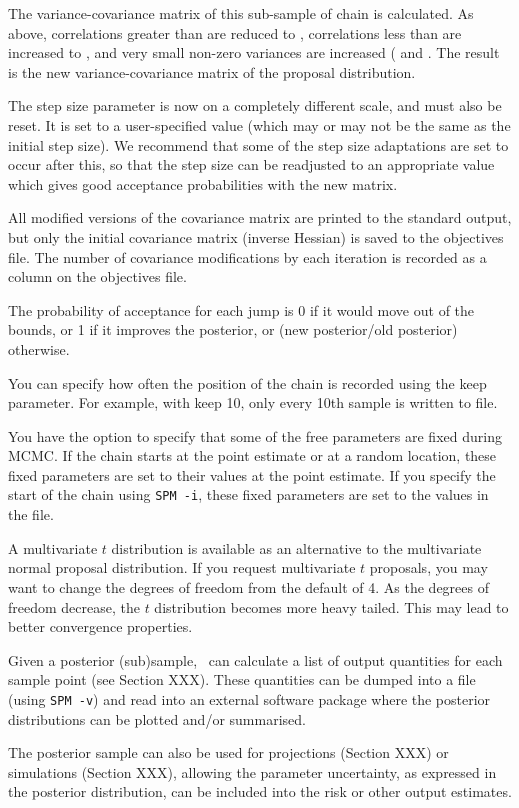 The variance-covariance matrix of this sub-sample of chain is calculated. As above, correlations greater than  are reduced to , correlations less than  are increased to  , and very small non-zero variances are increased ( and . The result is the new variance-covariance matrix of the proposal distribution.

The step size parameter is now on a completely different scale, and must also be reset. It is set to a user-specified value (which may or may not be the same as the initial step size). We recommend that some of the step size adaptations are set to occur after this, so that the step size can be readjusted to an appropriate value which gives good acceptance probabilities with the new matrix. 

All modified versions of the covariance matrix are printed to the standard output, but only the initial covariance matrix (inverse Hessian) is saved to the objectives file. The number of covariance modifications by each iteration is recorded as a column on the objectives file. 

The probability of acceptance for each jump is 0 if it would move out of the bounds, or 1 if it improves the posterior, or (new posterior/old posterior) otherwise. 

You can specify how often the position of the chain is recorded using the keep parameter. For example, with keep 10, only every 10th sample is written to file. 

You have the option to specify that some of the free parameters are fixed during MCMC. If the chain starts at the point estimate or at a random location, these fixed parameters are set to their values at the point estimate. If you specify the start of the chain using \texttt{SPM -i}, these fixed parameters are set to the values in the file.

A multivariate $t$ distribution is available as an alternative to the multivariate normal proposal distribution. If you request multivariate $t$ proposals, you may want to change the degrees of freedom from the default of 4. As the degrees of freedom decrease, the $t$ distribution becomes more heavy tailed. This may lead to better convergence properties.

Given a posterior (sub)sample, \SPM\ can calculate a list of output quantities for each sample point (see Section XXX). These quantities can be dumped into a file (using \texttt{SPM -v}) and read into an external software package where the posterior distributions can be plotted and/or summarised. 

The posterior sample can also be used for projections (Section XXX) or simulations (Section XXX), allowing the parameter uncertainty, as expressed in the posterior distribution, can be included into the risk or other output estimates.

